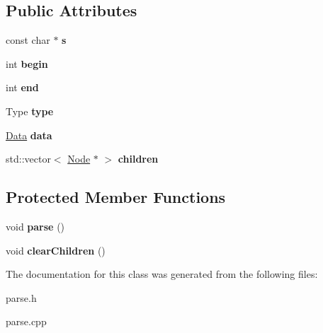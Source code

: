 \subsection*{Public Attributes}
\begin{DoxyCompactItemize}
\item 
\hypertarget{classparse_1_1_node_a71b2c8efa3df8dac06ec93aa2890636c}{
const char $\ast$ {\bfseries s}}
\label{classparse_1_1_node_a71b2c8efa3df8dac06ec93aa2890636c}

\item 
\hypertarget{classparse_1_1_node_a61bc6c394e8663082327e3cf7f7b0a8d}{
int {\bfseries begin}}
\label{classparse_1_1_node_a61bc6c394e8663082327e3cf7f7b0a8d}

\item 
\hypertarget{classparse_1_1_node_a5b2c37eaa4fbd9f32a9a91fbb4a95781}{
int {\bfseries end}}
\label{classparse_1_1_node_a5b2c37eaa4fbd9f32a9a91fbb4a95781}

\item 
\hypertarget{classparse_1_1_node_a67c274650ec5dee32067f19a3ff3223a}{
Type {\bfseries type}}
\label{classparse_1_1_node_a67c274650ec5dee32067f19a3ff3223a}

\item 
\hypertarget{classparse_1_1_node_a9bab9e21d3c186688b3169d499ef7af4}{
\hyperlink{classparse_1_1_data}{Data} {\bfseries data}}
\label{classparse_1_1_node_a9bab9e21d3c186688b3169d499ef7af4}

\item 
\hypertarget{classparse_1_1_node_af3c7f22adb4488b70b432907f255e2a4}{
std::vector$<$ \hyperlink{classparse_1_1_node}{Node} $\ast$ $>$ {\bfseries children}}
\label{classparse_1_1_node_af3c7f22adb4488b70b432907f255e2a4}

\end{DoxyCompactItemize}
\subsection*{Protected Member Functions}
\begin{DoxyCompactItemize}
\item 
\hypertarget{classparse_1_1_node_af294665a037deb78fe2a839d8be65fdf}{
void {\bfseries parse} ()}
\label{classparse_1_1_node_af294665a037deb78fe2a839d8be65fdf}

\item 
\hypertarget{classparse_1_1_node_acdfa2f21dea5f671aa653ee607500d99}{
void {\bfseries clearChildren} ()}
\label{classparse_1_1_node_acdfa2f21dea5f671aa653ee607500d99}

\end{DoxyCompactItemize}


The documentation for this class was generated from the following files:\begin{DoxyCompactItemize}
\item 
parse.h\item 
parse.cpp\end{DoxyCompactItemize}
